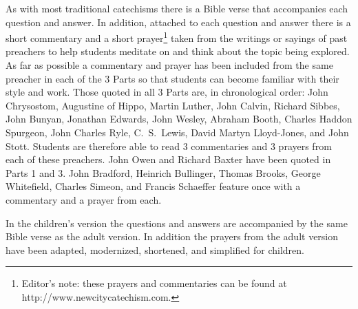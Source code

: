 \documentclass[]{memoir}
\begin{document}
As with most traditional catechisms there is a Bible verse that accompanies each question and answer. In addition, attached to each question and answer there is a short commentary and a short prayer\footnote{Editor's note: these prayers and commentaries can be found at http:/\slash{}www.new\hspace{0em}city\hspace{0em}cate\hspace{0em}chism.\hspace{0em}com.} taken from the writings or sayings of past preachers to help students meditate on and think about the topic being explored. As far as possible a commentary and prayer has been included from the same preacher in each of the 3 Parts so that students can become familiar with their style and work. Those quoted in all 3 Parts are, in chronological order: John Chrysostom, Augustine of Hippo, Martin Luther, John Calvin, Richard Sibbes, John Bunyan, Jonathan Edwards, John Wesley, Abraham Booth, Charles Haddon Spurgeon, John Charles Ryle, C.~S.\ Lewis, David Martyn Lloyd-Jones, and John Stott. Students are therefore able to read 3 commentaries and 3 prayers from each of these preachers. John Owen and Richard Baxter have been quoted in Parts 1 and 3. John Bradford, Heinrich Bullinger, Thomas Brooks, George Whitefield, Charles Simeon, and Francis Schaeffer feature once with a commentary and a prayer from each.

In the children's version the questions and answers are accompanied by the same Bible verse as the adult version. In addition the prayers from the adult version have been adapted, modernized, shortened, and simplified for children.
\end{document}
